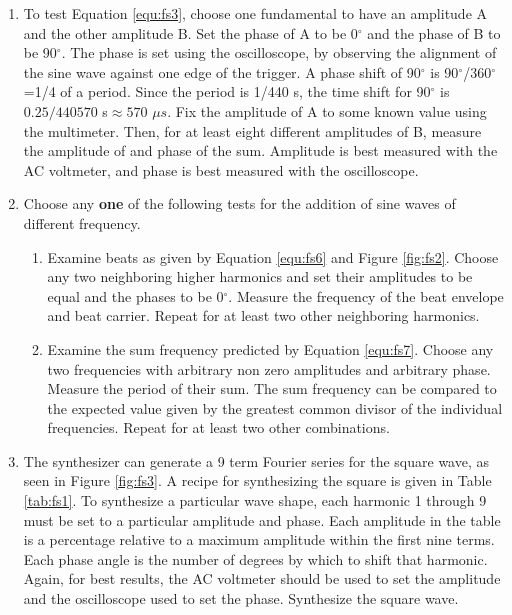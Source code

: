 \begin{enumerate}
\begin{marginfigure}
\caption*{Half Wave}
\label{fig:fs10}
\end{marginfigure}



\item To test Equation \ref{equ:fs3}, choose one fundamental to have an amplitude A and the other amplitude B. Set the phase of A to be 0$^{\circ}$ and the phase of B to be 90$^{\circ}$. The phase is set using the oscilloscope, by observing the alignment of the sine wave against one edge of the trigger. A phase shift of 90$^{\circ}$ is 90$^{\circ}$/360$^{\circ}$=1/4 of a period. Since the period is 1/440 s, the time shift for 90$^{\circ}$ is $0.25/440570$ s$\approx 570$ $\mu s$. Fix the amplitude of A to some known value using the multimeter. Then, for at least eight different amplitudes of B, measure the amplitude of and phase of the sum. Amplitude is best measured with the AC voltmeter, and phase is best measured with the oscilloscope.

\item Choose any {\bf one} of the following tests for the addition of sine waves of different frequency.

\begin{enumerate}[label=(\Alph*)]
\item Examine beats as given by Equation \ref{equ:fs6} and Figure \ref{fig:fs2}. Choose any two neighboring higher harmonics and set their amplitudes to be equal and the phases to be 0$^{\circ}$. Measure the frequency of the beat envelope and beat carrier. Repeat for at least two other neighboring harmonics.

\item Examine the sum frequency predicted by Equation \ref{equ:fs7}. Choose any two frequencies with arbitrary non zero amplitudes and arbitrary phase. Measure the period of their sum. The sum frequency can be compared to the expected value given by the greatest common divisor of the individual frequencies. Repeat for at least two other combinations.
\end{enumerate}

\item The synthesizer can generate a 9 term Fourier series for the square wave, as seen in Figure \ref{fig:fs3}. A recipe for synthesizing the square is given in Table \ref{tab:fs1}. To synthesize a particular wave shape, each harmonic 1 through 9 must be set to a particular amplitude and phase. Each amplitude in the table is a percentage relative to a maximum amplitude within the first nine terms. Each phase angle is the number of degrees by which to shift that harmonic. Again, for best results, the AC voltmeter should be used to set the amplitude and the oscilloscope used to set the phase. Synthesize the square wave.


\end{enumerate}
